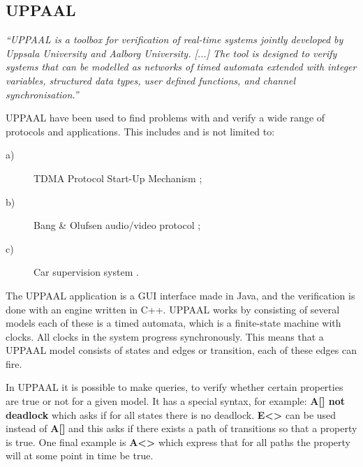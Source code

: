 \subsection{UPPAAL}\label{subsec:uppaal}
\begin{tcolorbox}[floatplacement=b,float,colback=white!5,colframe=aaublue!50,title=What is UPPAAL]
\textit{``UPPAAL is a toolbox for verification of real-time systems jointly developed by Uppsala University and Aalborg University. [...] The tool is designed to verify systems that can be modelled as networks of timed automata extended with integer variables, structured data types, user defined functions, and channel synchronisation.''} \cite{tutorial04}
\end{tcolorbox} 

UPPAAL have been used to find problems with and verify a wide range of protocols and applications. 
This includes and is not limited to: 
\begin{description}
    \item[a)] TDMA Protocol Start-Up Mechanism \cite{Lonn:1997:FVT:826040.827011};
    \item[b)] Bang \& Olufsen audio/video protocol \cite{Havelund97formalmodeling};
    \item[c)] Car supervision system \cite{gebremichael2004formal}.
\end{description}
The UPPAAL application is a GUI interface made in Java, and the verification is done with an engine written in C++. 
UPPAAL works by consisting of several models each of these is a timed automata, which is a finite-state machine with clocks. 
All clocks in the system progress synchronously. 
This means that a UPPAAL model consists of states and edges or transition, each of these edges can fire. 

In UPPAAL it is possible to make queries, to verify whether certain properties are true or not for a given model.
It has a special syntax, for example: \textbf{A[] not deadlock} which asks if for all states there is no deadlock.
\textbf{E<>} can be used instead of \textbf{A[]} and this asks if there exists a path of transitions so that a property is true.
One final example is \textbf{A<>} which express that for all paths the property will at some point in time be true.
